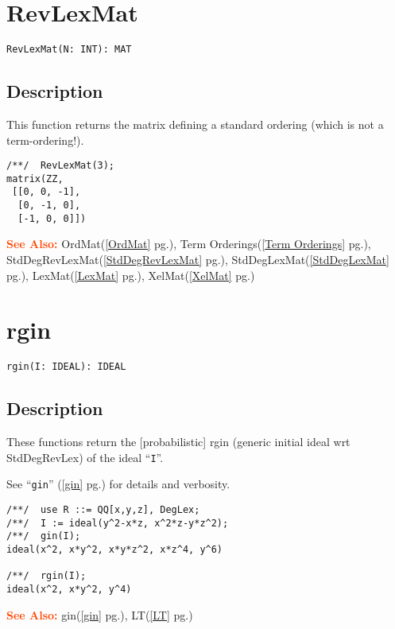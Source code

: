 \documentclass[a4paper]{mybook}
\newenvironment{command}{}{} %
\newcommand\SeeAlso{\par\textcolor{OrangeRed}{\textbf{\large See Also: }}}
\begin{document}
\section{RevLexMat}
\label{RevLexMat}
\begin{command} %


\begin{Verbatim}[label=syntax, rulecolor=\color{MidnightBlue},
frame=single]
RevLexMat(N: INT): MAT
\end{Verbatim}


\subsection*{Description}

This function returns the matrix defining a standard ordering (which is
not a term-ordering!).
\begin{Verbatim}[label=example, rulecolor=\color{PineGreen}, frame=single]
/**/  RevLexMat(3);
matrix(ZZ,
 [[0, 0, -1],
  [0, -1, 0],
  [-1, 0, 0]])
\end{Verbatim}


\SeeAlso %
  OrdMat(\ref{OrdMat} pg.\pageref{OrdMat}), 
    Term Orderings(\ref{Term Orderings} pg.\pageref{Term Orderings}), 
    StdDegRevLexMat(\ref{StdDegRevLexMat} pg.\pageref{StdDegRevLexMat}), 
    StdDegLexMat(\ref{StdDegLexMat} pg.\pageref{StdDegLexMat}), 
    LexMat(\ref{LexMat} pg.\pageref{LexMat}), 
    XelMat(\ref{XelMat} pg.\pageref{XelMat})
\end{command} %

\section{rgin}
\label{rgin}
\begin{command} %


\begin{Verbatim}[label=syntax, rulecolor=\color{MidnightBlue},
frame=single]
rgin(I: IDEAL): IDEAL
\end{Verbatim}


\subsection*{Description}

These functions return the [probabilistic] rgin
(generic initial ideal wrt StdDegRevLex) of the ideal ``\verb&I&''.
\par 
See ``\verb&gin&'' (\ref{gin} pg.\pageref{gin}) for details and verbosity.
\begin{Verbatim}[label=example, rulecolor=\color{PineGreen}, frame=single]
/**/  use R ::= QQ[x,y,z], DegLex;
/**/  I := ideal(y^2-x*z, x^2*z-y*z^2);
/**/  gin(I);
ideal(x^2, x*y^2, x*y*z^2, x*z^4, y^6)

/**/  rgin(I);  
ideal(x^2, x*y^2, y^4)
\end{Verbatim}


\SeeAlso %
  gin(\ref{gin} pg.\pageref{gin}), 
    LT(\ref{LT} pg.\pageref{LT})
\end{command} %
\end{document}
